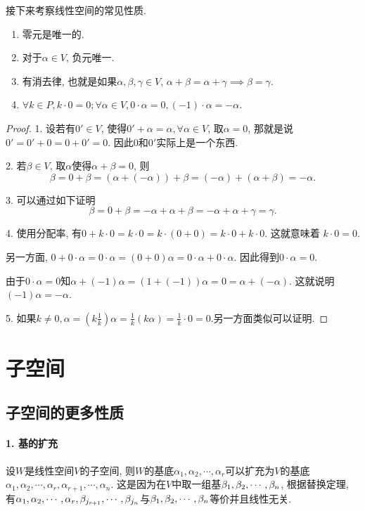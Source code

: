 \documentclass{ctexart}
\begin{document}
接下来考察线性空间的常见性质. 

\begin{prop}
    \begin{enumerate} 对于这个定义, 立即有以下的性质. 
        \item 零元是唯一的. 
\item 对于$\alpha\in V$, 负元唯一. 
\item 有消去律, 也就是如果$\alpha, \beta, \gamma\in V$, $\alpha+\beta=\alpha+\gamma\implies \beta=\gamma$.
\item $\forall k\in P, k\cdot 0=0; \forall \alpha\in V, 0\cdot \alpha=0, (-1)\cdot \alpha=-\alpha$. 
    \end{enumerate}
    \end{prop}
\begin{proof}
    1. 设若有$0' \in V$, 使得$0'+\alpha=\alpha, \forall \alpha\in V$, 取$\alpha=0$, 那就是说$0'=0'+0=0+0'=0$. 因此$0$和$0'$实际上是一个东西. 

    2. 若$\beta\in V$, 取$\alpha$使得$\alpha+\beta=0$, 则
    \[
        \beta=0+\beta=(\alpha+(-\alpha))+\beta=(-\alpha)+(\alpha+\beta)=-\alpha.
    \]

    3. 可以通过如下证明
    \[
        \beta=0+\beta=-\alpha+\alpha+\beta=-\alpha+\alpha+\gamma=\gamma .
    \]

    4. 使用分配率, 有$0+k \cdot 0=k \cdot 0=k \cdot(0+0)=k \cdot 0+k \cdot 0$. 这就意味着
    $k \cdot 0=0$. 

    另一方面, $0+0 \cdot \alpha=0 \cdot \alpha=(0+0) \alpha=0 \cdot \alpha+0 \cdot \alpha$. 因此得到$0 \cdot \alpha=0$. 

    由于$0\cdot \alpha=0$知$\alpha+(-1) \alpha=(1+(-1)) \alpha=0=\alpha+(-\alpha)$. 这就说明$(-1)\alpha=-\alpha$. 


    5. 如果$k\neq 0, \alpha=(k \frac 1k)\alpha=\frac 1k (k\alpha)=\frac 1k \cdot 0=0$.另一方面类似可以证明.
    
\end{proof}



\section{子空间}

\subsection{子空间的更多性质}

\paragraph{1. 基的扩充} 设$W$是线性空间$V$的子空间, 则$W$的基底$\alpha_1, \alpha_2,\cdots, \alpha_r$可以扩充为$V$的基底$\alpha_1, \alpha_2,\cdots, \alpha_r,\alpha_{r+1},\cdots, \alpha_n$. 
这是因为在$V$中取一组基${{\beta}_1, {\beta}_2,\cdots, {\beta}_{n}}$, 根据替换定理, 有${{\alpha}_1, {\alpha}_2,\cdots, {\alpha}_{r}},\beta_{j_{r+1}},\cdots, \beta_{j_n}$与${{\beta}_1, {\beta}_2,\cdots, {\beta}_{n}}$等价并且线性无关. 
\end{document}
